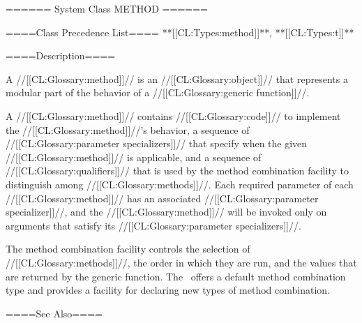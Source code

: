 ====== System Class METHOD ======

====Class Precedence List==== **[[CL:Types:method]]**, **[[CL:Types:t]]**

====Description====

A //[[CL:Glossary:method]]// is an //[[CL:Glossary:object]]// that represents a modular part of the behavior of a //[[CL:Glossary:generic function]]//.

A //[[CL:Glossary:method]]// contains //[[CL:Glossary:code]]// to implement the //[[CL:Glossary:method]]//'s behavior, a sequence of //[[CL:Glossary:parameter specializers]]// that specify when the given //[[CL:Glossary:method]]// is applicable, and a sequence of //[[CL:Glossary:qualifiers]]// that is used by the method combination facility to distinguish among //[[CL:Glossary:methods]]//. Each required parameter of each //[[CL:Glossary:method]]// has an associated //[[CL:Glossary:parameter specializer]]//, and the //[[CL:Glossary:method]]// will be invoked only on arguments that satisfy its //[[CL:Glossary:parameter specializers]]//.

The method combination facility controls the selection of //[[CL:Glossary:methods]]//, the order in which they are run, and the values that are returned by the generic function. The \CLOS\ offers a default method combination type and provides a facility for declaring new types of method combination.

====See Also====

{\secref\GFsAndMethods}

